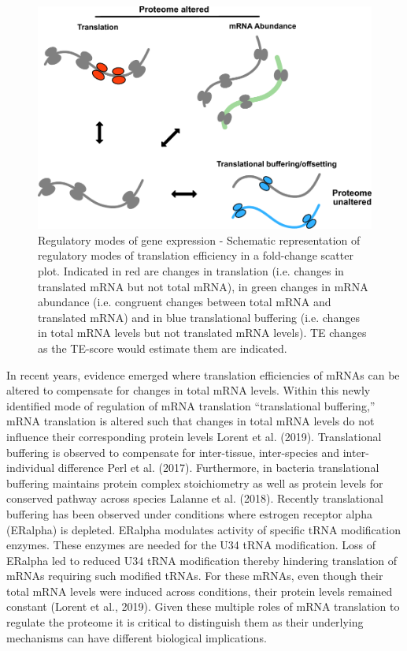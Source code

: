 \documentclass[
  12pt,
  openany]{book}
\begin{document}
\begin{figure}
  \includegraphics{./figures/geneModes_MRNA.pdf}
  \caption{Regulatory modes of gene expression - Schematic representation of regulatory modes of translation efficiency in a fold-change scatter plot. Indicated in red are changes in translation (i.e. changes in translated mRNA but not total mRNA), in green changes in mRNA abundance (i.e. congruent changes between total mRNA and translated mRNA) and in blue translational buffering (i.e. changes in total mRNA levels but not translated mRNA levels). TE changes as the TE-score would estimate them are indicated.\label{fig:mRNA}}
\end{figure}

In recent years, evidence emerged where translation efficiencies of mRNAs can be altered to compensate for changes in total mRNA levels. Within this newly identified mode of regulation of mRNA translation ``translational buffering,'' mRNA translation is altered such that changes in total mRNA levels do not influence their corresponding protein levels Lorent et al. (2019). Translational buffering is observed to compensate for inter-tissue, inter-species and inter-individual difference Perl et al. (2017). Furthermore, in bacteria translational buffering maintains protein complex stoichiometry as well as protein levels for conserved pathway across species Lalanne et al. (2018). Recently translational buffering has been observed under conditions where estrogen receptor alpha (ERalpha) is depleted. ERalpha modulates activity of specific tRNA modification enzymes. These enzymes are needed for the U34 tRNA modification. Loss of ERalpha led to reduced U34 tRNA modification thereby hindering translation of mRNAs requiring such modified tRNAs. For these mRNAs, even though their total mRNA levels were induced across conditions, their protein levels remained constant (Lorent et al., 2019). Given these multiple roles of mRNA translation to regulate the proteome it is critical to distinguish them as their underlying mechanisms can have different biological implications.
\end{document}
